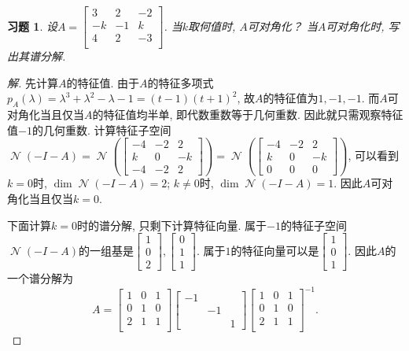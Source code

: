 \documentclass{ctexart}
\newtheorem{exercise}[thm]{习题}
\DeclareMathOperator{\nullspace}{\mathcal{N}}
\begin{document}
\begin{exercise}
设$A=\begin{bmatrix}
3 & 2 & -2\\ -k& -1 & k \\ 4& 2 &-3 \\
\end{bmatrix}$. 
当$k$取何值时, $A$可对角化？
当$A$可对角化时, 写出其谱分解. 
\end{exercise}
\begin{proof}[解]
	先计算$A$的特征值. 由于$A$的特征多项式$p_A(\lambda)=\lambda^3+\lambda^2-\lambda-1=(t-1)(t+1)^2$, 故$A$的特征值为$1,-1,-1$. 
	而$A$可对角化当且仅当$A$的特征值均半单, 即代数重数等于几何重数. 因此就只需观察特征值$-1$的几何重数. 
	计算特征子空间$\nullspace(-I-A)
	=\nullspace\left(\begin{bmatrix}
		-4 & -2 & 2\\ k & 0 & -k \\ -4 & -2 & 2 
	\end{bmatrix}\right)
	=\nullspace\left(\begin{bmatrix}
		-4 & -2 & 2\\ k & 0 & -k \\ 0 & 0 &0  
	\end{bmatrix}\right)$, 可以看到$k=0$时, $\dim \nullspace(-I-A)=2$; $k\ne 0$时, $\dim \nullspace(-I-A)=1$. 
	因此$A$可对角化当且仅当$k=0$. 

	下面计算$k=0$时的谱分解, 只剩下计算特征向量. 属于$-1$的特征子空间$\nullspace(-I-A)$的一组基是$\begin{bmatrix}
		1 \\0\\2
	\end{bmatrix},\begin{bmatrix}
		0\\1\\1
	\end{bmatrix}$. 属于$1$的特征向量可以是$\begin{bmatrix}
		1\\0\\1
	\end{bmatrix}$. 因此$A$的一个谱分解为
	\[
		A=\begin{bmatrix}
			1 & 0 & 1\\ 0 & 1  &0\\ 2& 1& 1\\
			\end{bmatrix}\begin{bmatrix}
			-1 && \\ & -1&\\ && 1
			\end{bmatrix}\begin{bmatrix}
			1 & 0 & 1\\ 0 & 1  &0\\ 2& 1& 1\\
		\end{bmatrix}^{-1}.
	\]
\end{proof}
\end{document}
